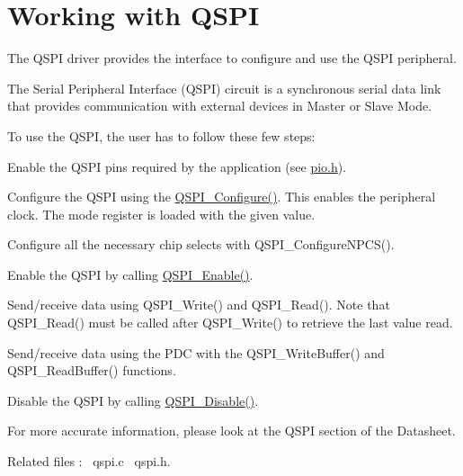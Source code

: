 \hypertarget{group__qspi__module}{}\section{Working with Q\+S\+PI}
\label{group__qspi__module}
The Q\+S\+PI driver provides the interface to configure and use the Q\+S\+PI peripheral.

The Serial Peripheral Interface (Q\+S\+PI) circuit is a synchronous serial data link that provides communication with external devices in Master or Slave Mode.

To use the Q\+S\+PI, the user has to follow these few steps\+:
\begin{DoxyEnumerate}
\item Enable the Q\+S\+PI pins required by the application (see \mbox{\hyperlink{pio_8h}{pio.\+h}}).
\item Configure the Q\+S\+PI using the \mbox{\hyperlink{qspi_8c_a540d57bb3a49cb62569937d3f54f7085}{Q\+S\+P\+I\+\_\+\+Configure()}}. This enables the peripheral clock. The mode register is loaded with the given value.
\item Configure all the necessary chip selects with Q\+S\+P\+I\+\_\+\+Configure\+N\+P\+C\+S().
\item Enable the Q\+S\+PI by calling \mbox{\hyperlink{qspi_8c_a481f9cf7a40eb4de632cfef883abbafd}{Q\+S\+P\+I\+\_\+\+Enable()}}.
\item Send/receive data using Q\+S\+P\+I\+\_\+\+Write() and Q\+S\+P\+I\+\_\+\+Read(). Note that Q\+S\+P\+I\+\_\+\+Read() must be called after Q\+S\+P\+I\+\_\+\+Write() to retrieve the last value read.
\item Send/receive data using the P\+DC with the Q\+S\+P\+I\+\_\+\+Write\+Buffer() and Q\+S\+P\+I\+\_\+\+Read\+Buffer() functions.
\item Disable the Q\+S\+PI by calling \mbox{\hyperlink{qspi_8c_a24e4ad68361409458213083438db8449}{Q\+S\+P\+I\+\_\+\+Disable()}}.
\end{DoxyEnumerate}

For more accurate information, please look at the Q\+S\+PI section of the Datasheet.

Related files \+:~\newline
qspi.\+c~\newline
 qspi.\+h.~\newline
 